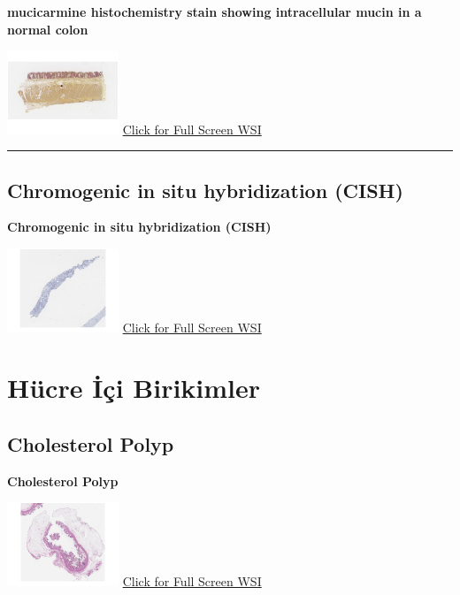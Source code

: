 \documentclass[
  letterpaper,
  paper=6in:9in,
  pagesize=pdftex,
  headinclude=on,
  footinclude=on,
  12pt]{scrbook}
\begin{document}
\textbf{mucicarmine histochemistry stain showing intracellular mucin in
a normal colon}

\href{https://images.patolojiatlasi.com/mucin/mucicarmine.html}{\includegraphics[width=0.25\textwidth,height=\textheight]{./screenshots/mucicarmine_screenshot.png}}
\href{https://images.patolojiatlasi.com/mucin/mucicarmine.html}{Click
for Full Screen WSI}

\begin{center}\rule{0.5\linewidth}{0.5pt}\end{center}

\hypertarget{sec-chromogenic-in-situ-hybridization-cish}{%
\section{Chromogenic in situ hybridization
(CISH)}\label{sec-chromogenic-in-situ-hybridization-cish}}

\textbf{Chromogenic in situ hybridization (CISH)}

\href{https://images.patolojiatlasi.com/her-cish/cish.html}{\includegraphics[width=0.25\textwidth,height=\textheight]{./screenshots/cish_screenshot.png}}
\href{https://images.patolojiatlasi.com/her2-cish/cish.html}{Click for
Full Screen WSI}

\hypertarget{sec-hucre-ici-birikimler}{%
\chapter{Hücre İçi Birikimler}\label{sec-hucre-ici-birikimler}}

\hypertarget{sec-cholesterol-polyp}{%
\section{Cholesterol Polyp}\label{sec-cholesterol-polyp}}

\textbf{Cholesterol Polyp}

\href{https://images.patolojiatlasi.com/cholesterolpolyp/HE.html}{\includegraphics[width=0.25\textwidth,height=\textheight]{./screenshots/cholesterolpolyp_screenshot.png}}
\href{https://images.patolojiatlasi.com/cholesterolpolyp/HE.html}{Click
for Full Screen WSI}
\end{document}
